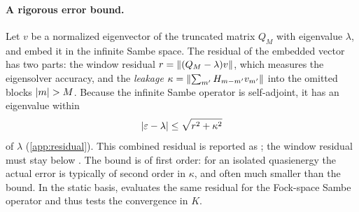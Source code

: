 \paragraph{A rigorous error bound.}
Let $v$ be a normalized eigenvector of the truncated matrix $Q_M$ with eigenvalue $\lambda$, and
embed it in the infinite Sambe space. The residual of the embedded vector has two parts:
the window residual $r=\lVert (Q_M-\lambda)v\rVert$, which measures the eigensolver accuracy, and
the \emph{leakage} $\kappa=\lVert \sum_{m'}H_{m-m'}v_{m'}\rVert$ into the omitted blocks
$\lvert m\rvert>M$. Because the infinite Sambe operator is self-adjoint, it has an eigenvalue within
\begin{equation}\label{eq:residual-bound}
  \lvert \varepsilon-\lambda\rvert\le\sqrt{r^2+\kappa^2}
\end{equation}
of $\lambda$ (\cref{app:residual}). This combined residual is reported as
; the window residual must stay below . The bound is
of first order: for an isolated quasienergy the actual error is typically of second order in
$\kappa$, and often much smaller than the bound. In the static basis, 
evaluates the same residual for the Fock-space Sambe operator and thus tests the
convergence in $K$.

